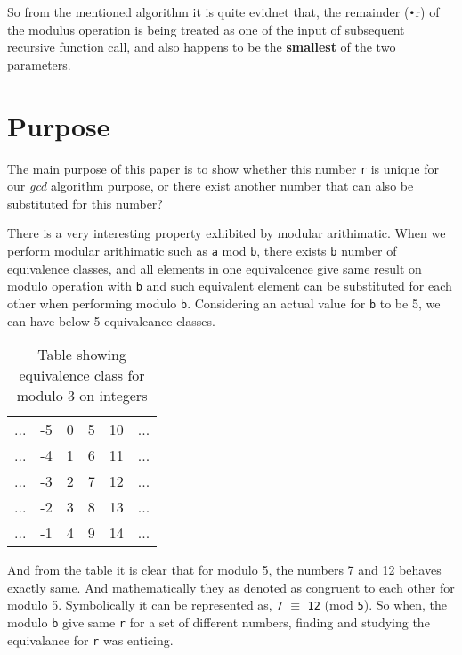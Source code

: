 \documentclass[12pt]{article}
\begin{document}
So from the mentioned algorithm it is quite evidnet that, the remainder (\texttt{•}{r}) of the modulus operation is being treated as one of the input of subsequent recursive function call, and also happens to be the \textbf{smallest} of the two parameters.

\section{Purpose}
The main purpose of this paper is to show whether this number \texttt{r} is unique for our \textit{gcd} algorithm purpose, or there exist another number that can also be substituted for this number?

There is a very interesting property exhibited by modular arithimatic.
When we perform modular arithimatic such as \texttt{a} mod \texttt{b}, there exists
\texttt{b} number of equivalence classes, and all elements in one equivalcence give same result on modulo operation with \texttt{b} and such equivalent element can be substituted for each other when performing modulo \texttt{b}.
\newline
Considering an actual value for \texttt{b} to be 5, we can have below 5 equivaleance classes.

\begin{table}[h!]
\centering
	\begin{tabular}{c c c c c c}
		... & -5 & 0 & 5 & 10 & ... \\
		... & -4 & 1 & 6 & 11 & ... \\
		... & -3 & 2 & 7 & 12 & ... \\
		... & -2 & 3 & 8 & 13 & ... \\
		... & -1 & 4 & 9 & 14 & ...
	\end{tabular}
\caption{Table showing equivalence class for modulo 3 on integers}
\label{table:1}
\end{table}

And from the table it is clear that for modulo 5, the numbers 7 and 12 behaves exactly same. And mathematically they as denoted as congruent to each other for modulo 5.
Symbolically it can be represented as, \texttt{7} $\equiv$ \texttt{12} (mod \texttt{5}).
So when, the modulo \texttt{b} give same \texttt{r} for a set of different numbers, finding and studying the equivalance for \texttt{r} was enticing.
\end{document}
